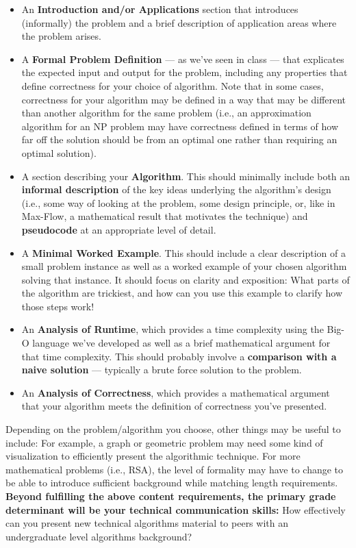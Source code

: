 \documentclass{article}
\begin{document}
\begin{itemize}
    \item An \textbf{Introduction and/or Applications} section that introduces (informally) the problem and a brief description of application areas where the problem arises. 
    \item A \textbf{Formal Problem Definition} --- as we've seen in class --- that explicates the expected input and output for the problem, including any properties that define correctness for your choice of algorithm. Note that in some cases, correctness for your algorithm may be defined in a way that may be different than another algorithm for the same problem (i.e., an approximation algorithm for an NP problem may have correctness defined in terms of how far off the solution should be from an optimal one rather than requiring an optimal solution). 
    \item A section describing your \textbf{Algorithm}. This should minimally include both an \textbf{informal description} of the key ideas underlying the algorithm's design (i.e., some way of looking at the problem, some design principle, or, like in Max-Flow, a mathematical result that motivates the technique) and \textbf{pseudocode} at an appropriate level of detail. 
    \item A \textbf{Minimal Worked Example}. This should include a clear description of a small problem instance as well as a worked example of your chosen algorithm solving that instance. It should focus on clarity and exposition: What parts of the algorithm are trickiest, and how can you use this example to clarify how those steps work!
    \item An \textbf{Analysis of Runtime}, which provides a time complexity using the Big-O language we've developed as well as a brief mathematical argument for that time complexity. This should probably involve a \textbf{comparison with a naive solution} --- typically a brute force solution to the problem.
    \item An \textbf{Analysis of Correctness}, which provides a mathematical argument that your algorithm meets the definition of correctness you've presented.
\end{itemize}

Depending on the problem/algorithm you choose, other things may be useful to include: For example, a graph or geometric problem may need some kind of visualization to efficiently present the algorithmic technique. For more mathematical problems (i.e., RSA), the level of formality may have to change to be able to introduce sufficient background while matching length requirements. \textbf{Beyond fulfilling the above content requirements, the primary grade determinant will be your technical communication skills:} How effectively can you present new technical algorithms material to peers with an undergraduate level algorithms background? 
\end{document}
